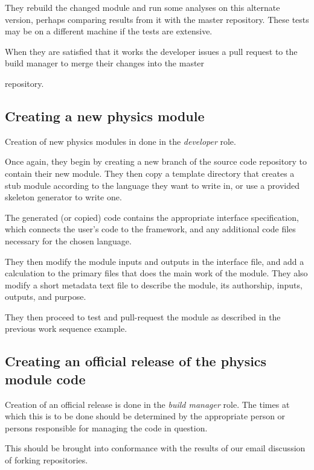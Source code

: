 \documentclass[draftmode,draftwater]{memarticle}
\begin{document}
They rebuild the changed module and run some analyses on this
alternate version, perhaps comparing results from it with the
master repository.  These tests may be on a different machine if the
tests are extensive.

When they are satisfied that it works the developer issues a pull
request to the build manager to merge their changes into the master

repository.

\subsection{Creating a new physics module}

Creation of new physics modules in done in the \emph{developer} role.

Once again, they begin by creating a new branch of the source code
repository to contain their new module.  They then copy a template directory
that creates a stub module according to the language they want to write
in, or use a provided skeleton generator to write one.

The generated (or copied) code contains the appropriate interface
specification,
which connects the user's code to the
framework, and any additional code files necessary for the chosen language.

They then modify the module inputs and outputs in the interface file,
and add a
calculation to the primary files that does the main work of the module.
They also modify a short metadata text file to describe the
module, its authorship, inputs, outputs, and purpose.

They then proceed to test and pull-request the module as described in the
previous work sequence example.

\subsection{Creating an official release of the physics module code}

Creation of an official release is done in the \emph{build manager}
role. The times at which this is to be done should be determined by the
appropriate person or persons responsible for managing the code in
question.

\begin{fixme}
  This should be brought into conformance with the results of our email
  discussion of forking repositories.
\end{fixme}
\end{document}
